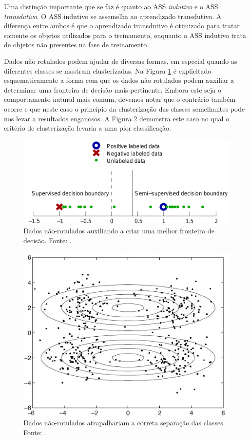 \documentclass[12pt]{article}
\begin{document}
Uma distinção importante que se faz é quanto ao ASS \emph{indutivo} e o ASS \emph{transdutivo}. O ASS indutivo se assemelha ao aprendizado transdutivo. A diferença entre ambos é que o aprendizado transdutivo é otimizado para tratar somente os objetos utilizados para o treinamento, enquanto o ASS indutivo trata de objetos não presentes na fase de treinamento.

Dados não rotulados podem ajudar de diversas formas, em especial quando as diferentes classes se mostram clusterizadas. Na Figura \ref{fig:help} é explicitado esquematicamente a forma com que os dados não rotulados podem auxiliar a determinar uma fronteira de decisão mais pertinente. Embora este seja o comportamento natural mais comum, devemos notar que o contrário também ocorre e que neste caso o princípio da clusterização das classes semelhantes pode nos levar a resultados enganosos. A Figura \ref{fig:nhelp} demonstra este caso no qual o critério de clusterização levaria a uma pior classificação.

\begin{figure}[!h]
  \begin{center}
    \includegraphics[width=.45\textwidth]{ssl-help}
  \end{center}
  \caption{Dados não-rotulados auxiliando a criar uma melhor fronteira de decisão. Fonte: \cite{zhu1}.}
  \label{fig:help}
\end{figure}

\begin{figure}[!h]
  \begin{center}
    \includegraphics[width=.45\textwidth]{ssl-nhelp}
  \end{center}
  \caption{Dados não-rotulados atrapalhariam a correta separação das classes. Fonte: \cite{tub2008}.}
  \label{fig:nhelp}
\end{figure}
\end{document}
